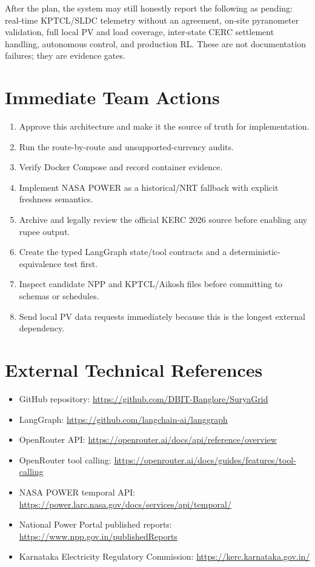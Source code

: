 After the plan, the system may still honestly report the following as pending: real-time
KPTCL/SLDC telemetry without an agreement, on-site pyranometer validation, full local PV and load
coverage, inter-state CERC settlement handling, autonomous control, and production RL. These are
not documentation failures; they are evidence gates.

\section{Immediate Team Actions}

\begin{enumerate}
  \item Approve this architecture and make it the source of truth for implementation.
  \item Run the route-by-route  and unsupported-currency audits.
  \item Verify Docker Compose and record container evidence.
  \item Implement NASA POWER as a historical/NRT fallback with explicit freshness semantics.
  \item Archive and legally review the official KERC 2026 source before enabling any rupee output.
  \item Create the typed LangGraph state/tool contracts and a deterministic-equivalence test first.
  \item Inspect candidate NPP and KPTCL/Aikosh files before committing to schemas or schedules.
  \item Send local PV data requests immediately because this is the longest external dependency.
\end{enumerate}

\section{External Technical References}

\begin{itemize}
  \item GitHub repository: \url{https://github.com/DBIT-Banglore/SuryaGrid}
  \item LangGraph: \url{https://github.com/langchain-ai/langgraph}
  \item OpenRouter API: \url{https://openrouter.ai/docs/api/reference/overview}
  \item OpenRouter tool calling: \url{https://openrouter.ai/docs/guides/features/tool-calling}
  \item NASA POWER temporal API: \url{https://power.larc.nasa.gov/docs/services/api/temporal/}
  \item National Power Portal published reports: \url{https://www.npp.gov.in/publishedReports}
  \item Karnataka Electricity Regulatory Commission: \url{https://kerc.karnataka.gov.in/}
\end{itemize}
